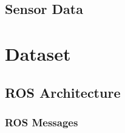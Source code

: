 \documentclass{erauthesis}
\begin{document}
\section{Sensor Data} \label{sensor_data}





\chapter{Dataset} \label{dataset}

\section{ROS Architecture} \label{ROS_architechture}

\subsection{ROS Messages} \label{ROS_mesages}
\end{document}
